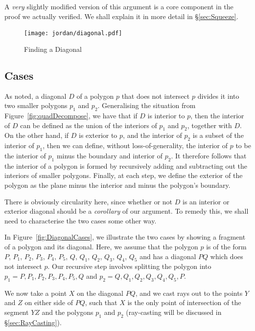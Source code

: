 A \emph{very} slightly modified version of this argument is a core component in the proof we actually verified. We shall explain it in more detail in \S\ref{sec:Squeeze}.

\begin{figure}
\centering
\texttt{[image: jordan/diagonal.pdf]}
\caption{Finding a Diagonal}
\label{fig:SqueezeDemo}
\end{figure}

\subsection{Cases}
As noted, a diagonal $D$ of a polygon $p$ that does not intersect $p$ divides it into two smaller polygons $p_1$ and $p_2$. Generalising the situation from Figure~\ref{fig:quadDecompose}, we have that if $D$ is interior to $p$, then the interior of $D$ can be defined as the union of the interiors of $p_1$ and $p_2$, together with $D$. On the other hand, if $D$ is exterior to $p$, and the interior of $p_2$ is a subset of the interior of $p_1$, then we can define, without loss-of-generality, the interior of $p$ to be the interior of $p_1$ minus the boundary and interior of $p_2$. It therefore follows that the interior of a polygon is formed by recursively adding and subtracting out the interiors of smaller polygons. Finally, at each step, we define the exterior of the polygon as the plane minus the interior and minus the polygon's boundary.

There is obviously circularity here, since whether or not $D$ is an interior or exterior diagonal should be a \emph{corollary} of our argument. To remedy this, we shall need to characterise the two cases some other way.

In Figure~\ref{fig:DiagonalCases}, we illustrate the two cases by showing a fragment of a polygon and its diagonal. Here, we assume that the polygon $p$ is of the form $P$, $P_1$, $P_2$, $P_3$, $P_4$, $P_5$, $Q$, $Q_1$, $Q_2$, $Q_3$, $Q_4$, $Q_5$ and has a diagonal $PQ$ which does not intersect $p$. Our recursive step involves splitting the polygon into $p_1 = P, P_1, P_2, P_3, P_4, P_5, Q$ and $p_2 = Q, Q_1, Q_2, Q_3, Q_4, Q_5, P.$

We now take a point $X$ on the diagonal $PQ$, and we cast rays out to the points $Y$ and $Z$ on either side of $PQ$, such that $X$ is the only point of intersection of the segment $YZ$ and the polygons $p_1$ and $p_2$ (ray-casting will be discussed in \S\ref{sec:RayCasting}). 

